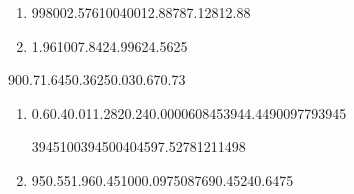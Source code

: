 
\begin{question}
    
    \begin{enumerate}[label={\textbf{\alph*)}}]

        \item 

              \begin{formula2}
                {99}{800}{2.576}{100}{400}{12.88}{787.12}{812.88}
              \end{formula2}

        \item 
              
              \begin{formula6} 
                {1.96}{100}{7.84}{24.99}{624.5}{625}
              \end{formula6}

    \end{enumerate}
\end{question}


\begin{question}

    \begin{formula3} 
        {90}{0.7}{1.645}{0.3}{625}{0.03}{0.67}{0.73}
    \end{formula3}
    
\end{question}


\begin{question}
    
    \begin{enumerate}[label={\textbf{\alph*)}}]

        \item 
            
            \begin{formula4}
                {0.6}{0.4}{0.01}{1.282}{0.24}{0.000060845}{3944.449009779}{3945}
            \end{formula4}

            \begin{formula5}
                {3945}{100}{394500}{4045}{97.527812114}{98}
            \end{formula5}
        
        \item 
            
            \begin{formula3}
                {95}{0.55}{1.96}{0.45}{100}{0.097508769}{0.4524}{0.6475}
            \end{formula3}

    \end{enumerate}
\end{question}


